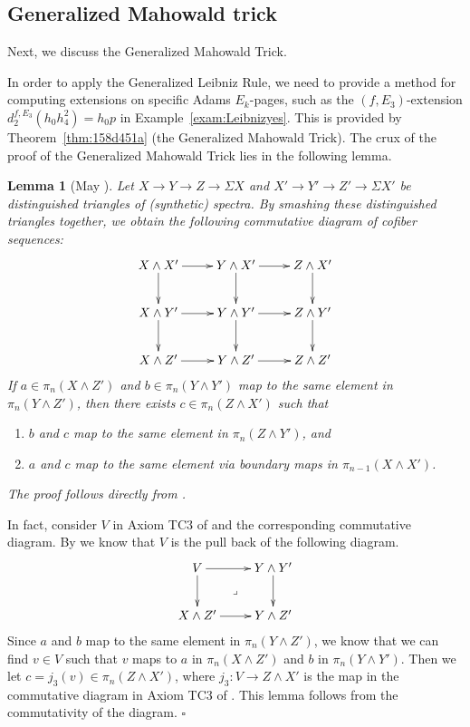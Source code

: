 \documentclass[12pt,a4paper]{article}
\renewenvironment{proof}{{\noindent\it\textbf{Proof}}\quad\it}{\hfill$\square$}
\newtheorem{lemma}[equation]{Lemma}
\newcommand{\Sus}{\Sigma}
\newcommand{\sma}{\wedge}
\begin{document}
\begin{sloppy}
\subsection{Generalized Mahowald trick}
Next, we discuss the Generalized Mahowald Trick.

In order to apply the Generalized Leibniz Rule, we need to provide a method for computing extensions on specific Adams $E_k$-pages, such as the $(f, E_3)$-extension $d_2^{f, E_3} (h_0h_4^2) = h_0 p$ in Example~\ref{exam:Leibnizyes}. This is provided by Theorem~\ref{thm:158d451a} (the Generalized Mahowald Trick). The crux of the proof of the Generalized Mahowald Trick lies in the following lemma.
\begin{lemma}[May \cite{May01}]\label{lem:452d218c}
    Let $X\to Y\to Z\to \Sus X$ and $X'\to Y'\to Z'\to \Sus X'$ be distinguished triangles of (synthetic) spectra. By smashing these distinguished triangles together, we obtain the following commutative diagram of cofiber sequences:
    $$\xymatrix{
    X\sma X' \ar[r] \ar[d] & Y\sma X' \ar[r] \ar[d] & Z\sma X' \ar[d]\\
    X\sma Y' \ar[d] \ar[r] & Y\sma Y' \ar[d] \ar[r] & Z\sma Y' \ar[d]\\
    X\sma Z' \ar[r] & Y\sma Z' \ar[r] & Z\sma Z'\\
    }$$
    If $a\in \pi_n(X\sma Z')$ and $b\in\pi_n(Y\sma Y')$ map to the same element in $\pi_n(Y\sma Z')$, then there exists $c\in \pi_n(Z\sma X')$ such that
    \begin{enumerate}
        \item $b$ and $c$ map to the same element in $\pi_n(Z\sma Y')$, and
        \item $a$ and $c$ map to the same element via boundary maps in $\pi_{n-1}(X\sma X')$.
    \end{enumerate}
\end{lemma}

\begin{proof}
The proof follows directly from \cite[Lemma 4.6]{May01}.

In fact, consider $V$ in Axiom TC3 of \cite[Section 4]{May01} and the corresponding commutative diagram. By \cite[Lemma 4.6]{May01} we know that $V$ is the pull back of the following diagram.
$$\xymatrix{
\ar@{}[dr]|\lrcorner V\ar[d]\ar[r]& Y\sma Y'\ar[d]\\
X\sma Z'\ar[r] & Y\sma Z'
}$$
Since $a$ and $b$ map to the same element in $\pi_n(Y\sma Z')$, we know that we can find $v\in V$ such that $v$ maps to $a$ in $\pi_n(X\sma Z')$ and $b$ in $\pi_n(Y\sma Y')$. Then we let $c=j_3(v)\in \pi_n(Z\sma X')$, where $j_3: V \rightarrow Z \sma X'$ is the map in the commutative diagram in Axiom TC3 of \cite[Section 4]{May01}. This lemma follows from the commutativity of the diagram.
\end{proof}


\end{sloppy}
\end{document}
